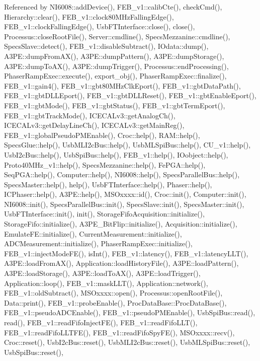 Referenced by N\+I6008\+::add\+Device(), F\+E\+B\+\_\+v1\+::calib\+Cte(), check\+Cmd(), Hierarchy\+::clear(), F\+E\+B\+\_\+v1\+::clock80\+M\+Hz\+Falling\+Edge(), F\+E\+B\+\_\+v1\+::clock\+Falling\+Edge(), Usb\+F\+T\+Interface\+::close(), close(), Processus\+::close\+Root\+File(), Server\+::cmdline(), Specs\+Mezzanine\+::cmdline(), Specs\+Slave\+::detect(), F\+E\+B\+\_\+v1\+::disable\+Subtract(), I\+Odata\+::dump(), A3\+P\+E\+::dump\+From\+A\+X(), A3\+P\+E\+::dump\+Pattern(), A3\+P\+E\+::dump\+Storage(), A3\+P\+E\+::dump\+To\+A\+X(), A3\+P\+E\+::dump\+Trigger(), Processus\+::end\+Processing(), Phaser\+Ramp\+Exec\+::execute(), export\+\_\+obj(), Phaser\+Ramp\+Exec\+::finalize(), F\+E\+B\+\_\+v1\+::gain4(), F\+E\+B\+\_\+v1\+::gbt80\+M\+Hz\+Clk\+Eport(), F\+E\+B\+\_\+v1\+::gbt\+Data\+Path(), F\+E\+B\+\_\+v1\+::gbt\+D\+L\+L\+Eport(), F\+E\+B\+\_\+v1\+::gbt\+D\+L\+L\+Reset(), F\+E\+B\+\_\+v1\+::gbt\+Enable\+Eport(), F\+E\+B\+\_\+v1\+::gbt\+Mode(), F\+E\+B\+\_\+v1\+::gbt\+Status(), F\+E\+B\+\_\+v1\+::gbt\+Term\+Eport(), F\+E\+B\+\_\+v1\+::gbt\+Track\+Mode(), I\+C\+E\+C\+A\+Lv3\+::get\+Analog\+Ch(), I\+C\+E\+C\+A\+Lv3\+::get\+Delay\+Line\+Ch(), I\+C\+E\+C\+A\+Lv3\+::get\+Main\+Reg(), F\+E\+B\+\_\+v1\+::global\+Pseudo\+P\+M\+Enable(), Croc\+::help(), R\+A\+M\+::help(), Specs\+Glue\+::help(), Usb\+M\+L\+I2c\+Bus\+::help(), Usb\+M\+L\+Spi\+Bus\+::help(), C\+U\+\_\+v1\+::help(), Usb\+I2c\+Bus\+::help(), Usb\+Spi\+Bus\+::help(), F\+E\+B\+\_\+v1\+::help(), I\+Oobject\+::help(), Proto40\+M\+Hz\+\_\+v1\+::help(), Specs\+Mezzanine\+::help(), Fe\+P\+G\+A\+::help(), Seq\+P\+G\+A\+::help(), Computer\+::help(), N\+I6008\+::help(), Specs\+Parallel\+Bus\+::help(), Specs\+Master\+::help(), help(), Usb\+F\+T\+Interface\+::help(), Phaser\+::help(), I\+C\+Phaser\+::help(), A3\+P\+E\+::help(), M\+S\+Oxxxx\+::id(), Croc\+::init(), Computer\+::init(), N\+I6008\+::init(), Specs\+Parallel\+Bus\+::init(), Specs\+Slave\+::init(), Specs\+Master\+::init(), Usb\+F\+T\+Interface\+::init(), init(), Storage\+Fifo\+Acquisition\+::initialize(), Storage\+Fifo\+::initialize(), A3\+P\+E\+\_\+\+Bit\+Flip\+::initialize(), Acquisition\+::initialize(), Emulate\+F\+E\+::initialize(), Current\+Measurement\+::initialize(), A\+D\+C\+Measurement\+::initialize(), Phaser\+Ramp\+Exec\+::initialize(), F\+E\+B\+\_\+v1\+::inject\+Mode\+F\+E(), is\+Int(), F\+E\+B\+\_\+v1\+::latency(), F\+E\+B\+\_\+v1\+::latency\+L\+L\+T(), A3\+P\+E\+::load\+From\+A\+X(), Application\+::load\+History\+File(), A3\+P\+E\+::load\+Pattern(), A3\+P\+E\+::load\+Storage(), A3\+P\+E\+::load\+To\+A\+X(), A3\+P\+E\+::load\+Trigger(), Application\+::loop(), F\+E\+B\+\_\+v1\+::mask\+L\+L\+T(), Application\+::network(), F\+E\+B\+\_\+v1\+::old\+Subtract(), M\+S\+Oxxxx\+::open(), Processus\+::open\+Root\+File(), Data\+::print(), F\+E\+B\+\_\+v1\+::probe\+Enable(), Proc\+Data\+Base\+::\+Proc\+Data\+Base(), F\+E\+B\+\_\+v1\+::pseudo\+A\+D\+C\+Enable(), F\+E\+B\+\_\+v1\+::pseudo\+P\+M\+Enable(), Usb\+Spi\+Bus\+::read(), read(), F\+E\+B\+\_\+v1\+::read\+Fifo\+Inject\+F\+E(), F\+E\+B\+\_\+v1\+::read\+Fifo\+L\+L\+T(), F\+E\+B\+\_\+v1\+::read\+Fifo\+L\+L\+T\+F\+E(), F\+E\+B\+\_\+v1\+::read\+Fifo\+Spy\+F\+E(), M\+S\+Oxxxx\+::recv(), Croc\+::reset(), Usb\+I2c\+Bus\+::reset(), Usb\+M\+L\+I2c\+Bus\+::reset(), Usb\+M\+L\+Spi\+Bus\+::reset(), Usb\+Spi\+Bus\+::reset(), 
